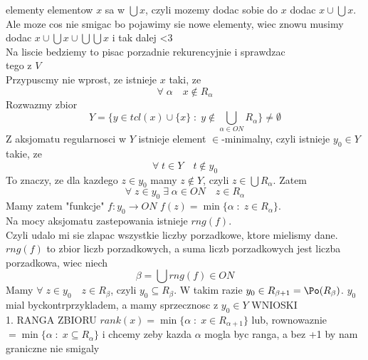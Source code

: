 \documentclass{article}
\begin{document}
elementy elementow $x$ sa w $\bigcup x$, czyli mozemy dodac sobie do $x$ dodac $x\cup\bigcup x$. Ale moze cos nie smigac bo pojawimy sie nowe elementy, wiec znowu musimy dodac $x\cup\bigcup x\cup\bigcup\bigcup x$ i tak dalej <3\bigskip\\
Na liscie bedziemy to pisac porzadnie rekurencyjnie i sprawdzac\bigskip\\
\dowod
tego z $V$\medskip\\
Przypuscmy nie wprost, ze istnieje $x$ taki, ze 
$$\forall\;\alpha\quad x\notin R_\alpha$$
Rozwazmy zbior
$$Y=\{y\in tcl(x)\cup\{x\}\;:\;y\notin\bigcup\limits_{\alpha\in ON} R_\alpha\}\neq \emptyset$$
Z aksjomatu regularnosci w $Y$ istnieje element $\in$-minimalny, czyli istnieje $y_0\in Y$ takie, ze
$$\forall\;t\in Y\quad t\notin y_0$$
To znaczy, ze dla kazdego $z\in y_0$ mamy $z\notin Y$, czyli $z\in \bigcup R_\alpha$. Zatem 
$$\forall\;z\in y_0\;\exists\;\alpha\in ON\quad z\in R_{\alpha}$$
Mamy zatem "funkcje" $f: y_0\to ON$ $f(z)=\min\{\alpha\;:\;z\in R_{\alpha}\}$.\\
Na mocy aksjomatu zastepowania istnieje $rng(f)$.\\
Czyli udalo mi sie zlapac wszystkie liczby porzadkowe, ktore mielismy dane. $rng(f)$ to zbior liczb porzadkowych, a suma liczb porzadkowych jest liczba porzadkowa, wiec niech
$$\beta=\bigcup rng(f)\in ON$$
Mamy $\forall\;z\in y_0\quad z\in R_\beta$, czyli $y_0\subseteq R_\beta$. W takim razie $y_0\in R_{\beta+1}=\Po(R_\beta)$. $y_0$ mial byckontrprzykladem, a mamy sprzecznosc z $y_0\in Y$
\kondow
WNIOSKI\medskip\\
1. {\large\color{def}RANGA ZBIORU} $rank(x)=\min\{\alpha\;:\;x\in R_{\alpha+1}\}$ lub, rownowaznie $=\min\{\alpha\;:\;x\subseteq R_\alpha\}$ i chcemy zeby kazda $\alpha$ mogla byc ranga, a bez +1 by nam graniczne nie smigaly
\end{document}
